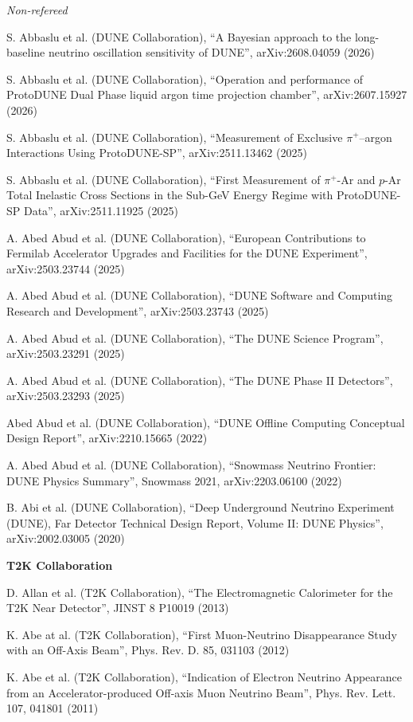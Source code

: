 {\it Non-refereed}
\begin{list2}
\item S. Abbaslu et al. (DUNE Collaboration), ``A Bayesian approach to the long-baseline neutrino oscillation sensitivity of DUNE'', arXiv:2608.04059 (2026)
\item S. Abbaslu et al. (DUNE Collaboration), ``Operation and performance of ProtoDUNE Dual Phase liquid argon time projection chamber'', arXiv:2607.15927 (2026)
\item S. Abbaslu et al. (DUNE Collaboration), ``Measurement of Exclusive $\pi^+$--argon Interactions Using ProtoDUNE-SP'', arXiv:2511.13462 (2025)
\item S. Abbaslu et al. (DUNE Collaboration), ``First Measurement of $\pi^+$-Ar and $p$-Ar Total Inelastic Cross Sections in the Sub-GeV Energy Regime with ProtoDUNE-SP Data'', arXiv:2511.11925 (2025)
\item A. Abed Abud et al. (DUNE Collaboration), ``European Contributions to Fermilab Accelerator Upgrades and Facilities for the DUNE Experiment'', arXiv:2503.23744 (2025)
\item A. Abed Abud et al. (DUNE Collaboration), ``DUNE Software and Computing Research and Development'', arXiv:2503.23743 (2025)
\item A. Abed Abud et al. (DUNE Collaboration), ``The DUNE Science Program'', arXiv:2503.23291 (2025)
\item A. Abed Abud et al. (DUNE Collaboration), ``The DUNE Phase II Detectors'', arXiv:2503.23293 (2025)
\item Abed Abud et al. (DUNE Collaboration), ``DUNE Offline Computing Conceptual Design Report'', arXiv:2210.15665 (2022)
\item A. Abed Abud et al. (DUNE Collaboration), ``Snowmass Neutrino Frontier: DUNE Physics Summary'', Snowmass 2021, arXiv:2203.06100 (2022)
\item B. Abi et al. (DUNE Collaboration), ``Deep Underground Neutrino Experiment (DUNE), Far Detector Technical Design Report, Volume II: DUNE Physics'', arXiv:2002.03005 (2020)
\end{list2}

\newpage
{\bf T2K Collaboration}
\begin{list2}
\item D. Allan et al. (T2K Collaboration), ``The Electromagnetic Calorimeter for the T2K Near Detector'', JINST 8 P10019 (2013)
\item K. Abe at al. (T2K Collaboration), ``First Muon-Neutrino Disappearance Study with an Off-Axis Beam'', Phys. Rev. D. 85, 031103 (2012)
\item K. Abe et al. (T2K Collaboration), ``Indication of Electron Neutrino Appearance from an Accelerator-produced Off-axis Muon Neutrino Beam'', Phys. Rev. Lett. 107, 041801 (2011)
\end{list2}

